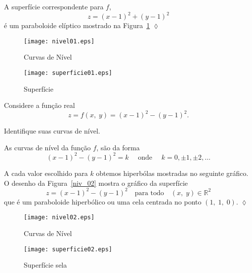 A superfície correspondente para $f$,
\begin{equation*}
	z=(x-1)^2+(y-1)^2
\end{equation*}
é um paraboloide elíptico mostrado na Figura~\ref{super_01} \hfill \(\lozenge\)
%
\begin{figure}[H]
	\begin{minipage}[t]{0.5\linewidth}
		\centering
		\texttt{[image: nivel01.eps]}
		\caption{Curvas de Nível}
		\label{niv_01}
	\end{minipage}%
	\begin{minipage}[t]{0.5\linewidth}
		\centering
		\texttt{[image: superficie01.eps]}
		\caption{Superfície}
		\label{super_01}
	\end{minipage}
\end{figure}

%
\begin{exer}\label{exe:2-2}
	Considere a função real
	\begin{equation*}
		z=f(x, \; y)=(x-1)^2-(y-1)^2.
	\end{equation*} 
	
	Identifique suas curvas de  nível.
\end{exer}

\solo As curvas de nível da função $f$, são da forma
\begin{equation*}
	(x-1)^2-(y-1)^2=k\quad \text{ onde }\quad k=0,\pm 1, \pm 2,\ldots
\end{equation*}

A cada valor escolhido para $k$ obtemos hiperbólas mostradas no seguinte gráfico. O desenho da Figura~\ref{niv_02} mostra o gráfico da superfície
\begin{equation*}
	z=(x-1)^2-(y-1)^2 \quad \textrm{para todo}\quad (x,\; y) \in \mathbb{R}^{2}
\end{equation*}
que é um paraboloide  hiperbólico ou uma cela centrada no ponto $(1,\;1,\;0)$. \hfill \( \lozenge\)
%

\begin{figure}[H]
	\begin{minipage}[t]{0.5\linewidth}
		\centering
		\texttt{[image: nivel02.eps]}
		\caption{Curvas de Nível}
		\label{niv_02}
	\end{minipage}%
	\begin{minipage}[t]{0.5\linewidth}
		\centering
		\texttt{[image: superficie02.eps]}
		\caption{Superfície sela}
		\label{super_02}
	\end{minipage}
\end{figure}

